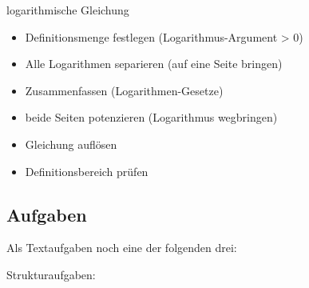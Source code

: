 \begin{rezept}{logarithmische Gleichung}{}
  \begin{itemize}
  \item Definitionsmenge festlegen (Logarithmus-Argument > 0)
  \item Alle Logarithmen separieren (auf eine Seite bringen)
  \item Zusammenfassen (Logarithmen-Gesetze)
  \item beide Seiten potenzieren (Logarithmus wegbringen)
  \item Gleichung auflösen
  \item Definitionsbereich prüfen
 \end{itemize}
\end{rezept}

\subsection*{Aufgaben}

Als Textaufgaben noch eine der folgenden drei:

Strukturaufgaben:

